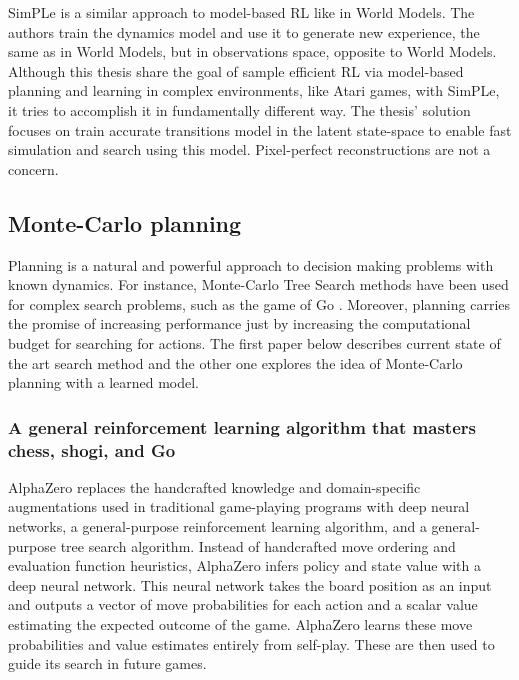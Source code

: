 SimPLe is a similar approach to model-based RL like in World Models. The authors train the dynamics model and use it to generate new experience, the same as in World Models, but in observations space, opposite to World Models. \\
Although this thesis share the goal of sample efficient RL via model-based planning and learning in complex environments, like Atari games, with SimPLe, it tries to accomplish it in fundamentally different way. The thesis' solution focuses on train accurate transitions model in the latent state-space to enable fast simulation and search using this model. Pixel-perfect reconstructions are not a concern.

\subsection{Monte-Carlo planning}

Planning is a natural and powerful approach to decision making problems with known dynamics. For instance, Monte-Carlo Tree Search methods \cite{Algo.MCTS} have been used for complex search problems, such as the game of Go \cite{Algo.AlphaGoZero}. Moreover, planning carries the promise of increasing performance just by increasing the computational budget for searching for actions. The first paper below describes current state of the art search method and the other one explores the idea of Monte-Carlo planning with a learned model.

\subsubsection{A general reinforcement learning algorithm that masters chess, shogi, and Go}

AlphaZero \cite{Algo.AlphaZero} replaces the handcrafted knowledge and domain-specific augmentations used in traditional game-playing programs with deep neural networks, a general-purpose reinforcement learning algorithm, and a general-purpose tree search algorithm. Instead of handcrafted move ordering and evaluation function heuristics, AlphaZero infers policy and state value with a deep neural network. This neural network takes the board position as an input and outputs a vector of move probabilities for each action and a scalar value estimating the expected outcome of the game. AlphaZero learns these move probabilities and value estimates entirely from self-play. These are then used to guide its search in future games.

